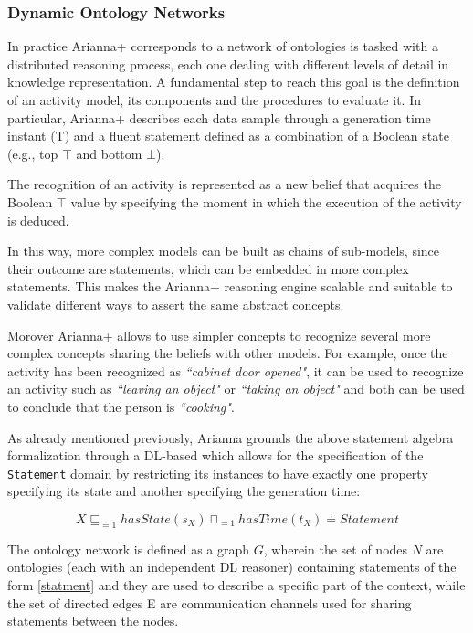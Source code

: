 \documentclass{thesisreport}
\begin{document}
 \subsubsection{Dynamic Ontology Networks}
 In practice Arianna+ corresponds to a network of ontologies is tasked with a distributed reasoning process, each one dealing with different levels of detail in knowledge representation. 
 A fundamental step to reach this goal is  the definition of an activity model, its components and the procedures to evaluate it. In particular, Arianna+ describes each data sample through a generation time instant (T) and a fluent statement defined as a combination of a Boolean state (e.g., top $\top$ and bottom $\bot$).
 
 The recognition of an activity is represented as a new belief that acquires the Boolean $\top$ value by specifying the moment in which the execution of the activity is deduced.
 
 In this way, more complex models can be built as chains of sub-models, since their outcome are statements, which can be embedded in more complex statements.
 This makes the Arianna+ reasoning engine scalable and suitable to validate different ways to assert the same abstract concepts.
 
Morover Arianna+ allows to use simpler concepts to recognize several more complex concepts sharing the beliefs  with other models. For example, once the activity has been recognized as \textit{``cabinet door opened"}, it can be used to recognize an activity such as \textit{``leaving an object"} or \textit{``taking an object"} and both can be used to conclude that the person is \textit{``cooking"}.

 As already mentioned previously, Arianna grounds the above statement algebra formalization through a DL-based which allows for the specification of the \texttt{Statement} domain by restricting its instances to have exactly one property specifying its state and another specifying the generation time:
 
 \begin{equation}
     X \sqsubseteq_{=1} hasState(s_X) \sqcap_{=1} hasTime(t_X) \doteq Statement
     \label{statment}
 \end{equation}
 
 The ontology network is defined as a graph $G$, wherein the set of nodes $N$ are ontologies (each with an independent DL reasoner) containing statements of the form \ref{statment} and they are used to describe a specific part of the context, while the set of directed edges E are communication channels used for sharing statements between the nodes.
 
\end{document}
